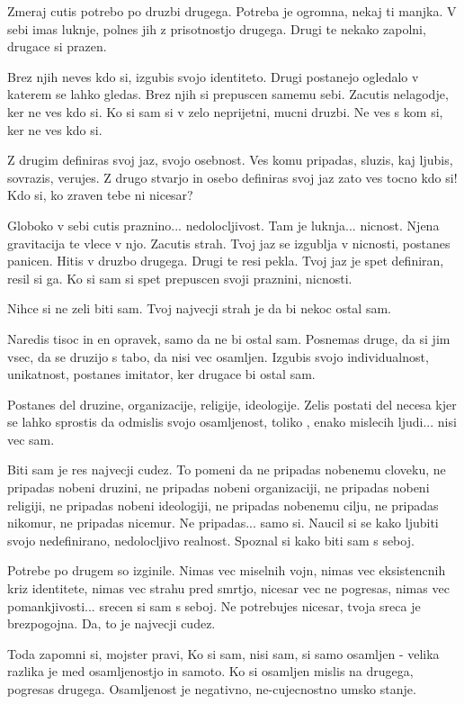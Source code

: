         

   Zmeraj cutis potrebo po druzbi drugega. Potreba je ogromna, nekaj ti manjka. V sebi imas luknje, polnes jih z prisotnostjo drugega. Drugi te nekako zapolni, drugace si prazen. 

Brez njih neves kdo si, izgubis svojo identiteto. Drugi postanejo ogledalo v katerem se lahko gledas. Brez njih si prepuscen samemu sebi. Zacutis nelagodje, ker ne ves kdo si. Ko si sam si v zelo neprijetni, mucni druzbi. Ne ves s kom si, ker ne ves kdo si. 

Z drugim definiras svoj jaz, svojo osebnost. Ves komu pripadas, sluzis, kaj ljubis, sovrazis, verujes. Z drugo stvarjo in osebo definiras svoj jaz zato ves tocno kdo si! Kdo si, ko zraven tebe ni nicesar? 

Globoko v sebi cutis praznino... nedolocljivost. Tam je luknja... nicnost. Njena gravitacija te vlece v njo. Zacutis strah. Tvoj jaz se izgublja v nicnosti, postanes panicen. Hitis v druzbo drugega. Drugi te resi pekla. Tvoj jaz je spet definiran, resil si ga. Ko si sam si spet prepuscen svoji praznini, nicnosti. 

Nihce si ne zeli biti sam. Tvoj najvecji strah je da bi nekoc ostal sam. 

Naredis tisoc in en opravek, samo da ne bi ostal sam. Posnemas druge, da si jim vsec, da se druzijo s tabo, da nisi vec osamljen. Izgubis svojo individualnost, unikatnost, postanes imitator, ker drugace bi ostal sam. 

Postanes del druzine, organizacije, religije, ideologije. Zelis postati del necesa kjer se lahko sprostis da odmislis svojo osamljenost, toliko , enako mislecih ljudi... nisi vec sam. 

Biti sam je res najvecji cudez. To pomeni da ne pripadas nobenemu cloveku, ne pripadas nobeni druzini, ne pripadas nobeni organizaciji, ne pripadas nobeni religiji, ne pripadas nobeni ideologiji, ne pripadas nobenemu cilju, ne pripadas nikomur, ne pripadas nicemur. Ne pripadas... samo si. Naucil si se kako ljubiti svojo nedefinirano, nedolocljivo realnost. Spoznal si kako biti sam s seboj. 

Potrebe po drugem so izginile. Nimas vec miselnih vojn, nimas vec eksistencnih kriz identitete, nimas vec strahu pred smrtjo, nicesar vec ne pogresas, nimas vec pomankjivosti... srecen si sam s seboj. Ne potrebujes nicesar, tvoja sreca je brezpogojna. Da, to je najvecji cudez. 

Toda zapomni si, mojster pravi,  Ko si sam, nisi sam, si samo osamljen - velika razlika je med osamljenostjo in samoto. Ko si osamljen mislis na drugega, pogresas drugega. Osamljenost je negativno, ne-cujecnostno umsko stanje. 

